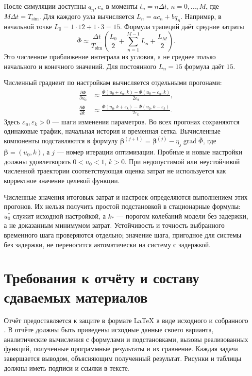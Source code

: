 \documentclass[12pt,a4paper]{article}
\begin{document}
После симуляции доступны $q_n,c_n$ в моменты $t_n=n\Delta t$,
$n=0,\ldots,M$, где $M\Delta t=T_{\mathrm{sim}}$.
Для каждого узла вычисляется $L_n=ac_n+bq_n$.
Например, в начальной точке $L_0=1\cdot12+1\cdot3=15$.
Формула трапеций даёт средние затраты
\[
\overline\Phi\approx\frac{\Delta t}{T_{\mathrm{sim}}}
\left(\frac{L_0}{2}+\sum_{n=1}^{M-1}L_n+\frac{L_M}{2}\right).
\]
Это численное приближение интеграла из условия, а не среднее только
начального и конечного значений. Для постоянного $L_n=15$ формула даёт $15$.

Численный градиент по настройкам вычисляется отдельными прогонами:
\[
\begin{aligned}
\frac{\partial\overline\Phi}{\partial u_0}
&\approx\frac{\overline\Phi(u_0+\varepsilon_u,k)
-\overline\Phi(u_0-\varepsilon_u,k)}{2\varepsilon_u},\\
\frac{\partial\overline\Phi}{\partial k}
&\approx\frac{\overline\Phi(u_0,k+\varepsilon_k)
-\overline\Phi(u_0,k-\varepsilon_k)}{2\varepsilon_k}.
\end{aligned}
\]
Здесь $\varepsilon_u,\varepsilon_k>0$ --- шаги изменения параметров.
Во всех прогонах сохраняются одинаковые трафик, начальная история
и временная сетка. Вычисленные компоненты подставляются в формулу
$\boldsymbol\beta^{(j+1)}=\boldsymbol\beta^{(j)}-\eta_j
\operatorname{grad}\overline\Phi$, где
$\boldsymbol\beta=(u_0,k)$, а $j$ --- номер итерации оптимизации.
Пробные и новые настройки должны удовлетворять $0<u_0<1$, $k>0$.
При недопустимой или неустойчивой численной траектории соответствующая
оценка затрат не используется как корректное значение целевой функции.

Численные значения итоговых затрат и настроек определяются выполнением
этих прогонов. Их нельзя получить простой подстановкой в стационарные
формулы: $u_0^*$ служит исходной настройкой, а $k_*$ --- порогом колебаний
модели без задержки, а не доказанным минимумом затрат.
Устойчивость и точность выбранного временного шага проверяются отдельно;
значение шага, пригодное для системы без задержки, не переносится автоматически
на систему с задержкой.


\newpage

\section*{Требования к отчёту и составу сдаваемых материалов}
Отчёт предоставляется к защите в формате LaTeX в виде исходного
 и собранного .
В отчёте должны быть приведены исходные данные своего варианта,
аналитические вычисления с формулами и подстановками, вызовы реализованных
функций, полученные программные результаты и их сравнение.
Каждая задача завершается выводом, объясняющим полученный результат.
Рисунки и таблицы должны иметь подписи и ссылки в тексте.
\end{document}
